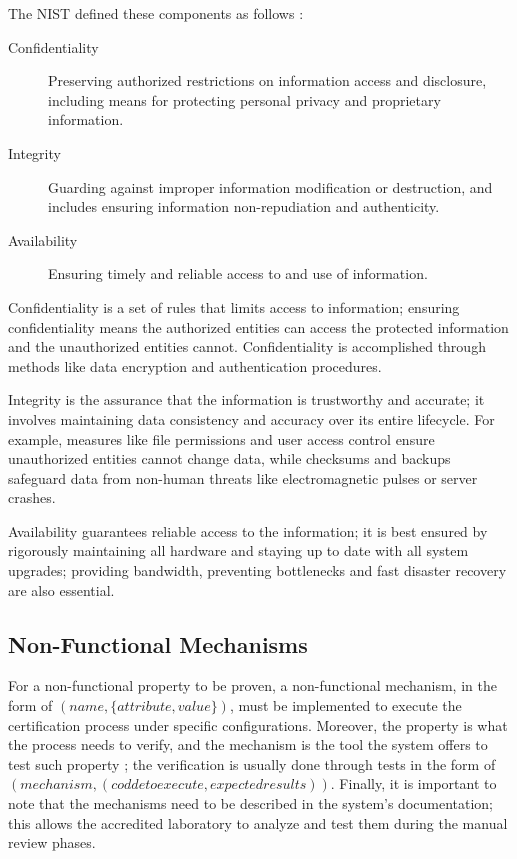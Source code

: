 The NIST defined these components as follows \cite{pub2005minimum}:
\begin{description}
    \item[Confidentiality] Preserving authorized restrictions on information access and disclosure, including means for protecting personal privacy and proprietary information.
    \item[Integrity] Guarding against improper information modification or destruction, and includes ensuring information non-repudiation and authenticity.
    \item[Availability] Ensuring timely and reliable access to and use of information.

\end{description}

Confidentiality is a set of rules that limits access to information; ensuring confidentiality means the authorized entities can access the protected information and the unauthorized entities cannot. Confidentiality is accomplished through methods like data encryption and authentication procedures.

Integrity is the assurance that the information is trustworthy and accurate; it involves maintaining data consistency and accuracy over its entire lifecycle. For example, measures like file permissions and user access control ensure unauthorized entities cannot change data, while checksums and backups safeguard data from non-human threats like electromagnetic pulses or server crashes.

Availability guarantees reliable access to the information; it is best ensured by rigorously maintaining all hardware and staying up to date with all system upgrades; providing bandwidth, preventing bottlenecks and fast disaster recovery are also essential.



\subsection{Non-Functional Mechanisms}
For a non-functional property to be proven, a non-functional mechanism, in the form of \( ( name, \{ attribute, value \} )\), must be implemented to execute the certification process under specific configurations. Moreover, the property is what the process needs to verify, and the mechanism is the tool the system offers to test such property \cite{anisetti2017semi}; the verification is usually done through tests in the form of \\ \( (mechanism, (codde to execute, expected results))\). Finally, it is important to note that the mechanisms need to be described in the system's documentation; this allows the accredited laboratory to analyze and test them during the manual review phases.


